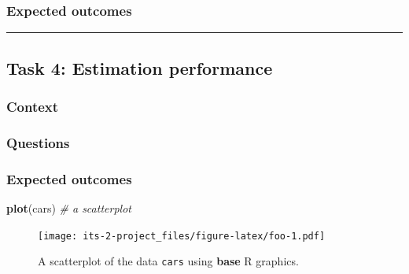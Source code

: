 \documentclass[]{book}
\newenvironment{Shaded}{\begin{snugshade}}{\end{snugshade}}
\newcommand{\CommentTok}[1]{\textcolor[rgb]{0.56,0.35,0.01}{\textit{#1}}}
\newcommand{\KeywordTok}[1]{\textcolor[rgb]{0.13,0.29,0.53}{\textbf{#1}}}
\newcommand{\NormalTok}[1]{#1}
\theoremstyle{definition}
\theoremstyle{definition}
\theoremstyle{definition}
\theoremstyle{remark}
\begin{document}
\hypertarget{expected-outcomes-10}{%
\subsubsection*{Expected outcomes}\label{expected-outcomes-10}}

\begin{center}\rule{0.5\linewidth}{\linethickness}\end{center}

\hypertarget{task-4-estimation-performance}{%
\subsection*{Task 4: Estimation
performance}\label{task-4-estimation-performance}}

\hypertarget{context-12}{%
\subsubsection*{Context}\label{context-12}}

\hypertarget{questions-11}{%
\subsubsection*{Questions}\label{questions-11}}

\hypertarget{expected-outcomes-11}{%
\subsubsection*{Expected outcomes}\label{expected-outcomes-11}}




\begin{Shaded}
\begin{Highlighting}[]
\KeywordTok{plot}\NormalTok{(cars)  }\CommentTok{# a scatterplot}
\end{Highlighting}
\end{Shaded}

\begin{figure}
\centering
\texttt{[image: its-2-project\_files/figure-latex/foo-1.pdf]}
\caption{\label{fig:foo}A scatterplot of the data \texttt{cars} using \textbf{base} R
graphics.}
\end{figure}
\end{document}
